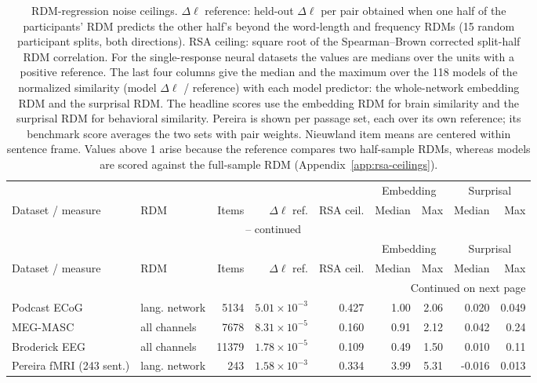 {\small\setlength{\tabcolsep}{3pt}
\begin{longtable}{@{}llrrrrrrr@{}}
\caption{RDM-regression noise ceilings. $\Delta\ell$ reference: held-out $\Delta\ell$ per pair obtained when one half of the
participants' RDM predicts the other half's beyond the word-length and frequency RDMs (15 random participant splits, both
directions). RSA ceiling: square root of the Spearman--Brown corrected split-half RDM correlation. For the single-response neural
datasets the values are medians over the units with a positive reference. The last four columns give the median and the
maximum over the 118 models of the normalized similarity (model $\Delta\ell$ / reference) with each model predictor: the
whole-network embedding RDM and the surprisal RDM. The headline scores use the embedding RDM for brain similarity and the
surprisal RDM for behavioral similarity. Pereira is shown per passage set, each over its own reference; its benchmark score
averages the two sets with pair weights. Nieuwland item means are centered within sentence frame. Values above 1 arise because
the reference compares two half-sample RDMs, whereas models are scored against the full-sample RDM
(Appendix~\ref{app:rsa-ceilings}).}\label{tab:rdm-ceilings} \\
\toprule
 & & & & & \multicolumn{2}{c}{Embedding} & \multicolumn{2}{c}{Surprisal} \\
\cmidrule(lr){6-7}\cmidrule(lr){8-9}
Dataset / measure & RDM & Items & $\Delta\ell$ ref. & RSA ceil. & Median & Max & Median & Max \\
\midrule
\endfirsthead
\multicolumn{9}{c}{\tablename\ \thetable{} -- continued} \\
\toprule
 & & & & & \multicolumn{2}{c}{Embedding} & \multicolumn{2}{c}{Surprisal} \\
\cmidrule(lr){6-7}\cmidrule(lr){8-9}
Dataset / measure & RDM & Items & $\Delta\ell$ ref. & RSA ceil. & Median & Max & Median & Max \\
\midrule
\endhead
\midrule\multicolumn{9}{r}{Continued on next page} \\
\endfoot
\bottomrule
\endlastfoot
Podcast ECoG & lang. network & 5134 & $5.01\times10^{-3}$ & 0.427 & 1.00 & 2.06 & 0.020 & 0.049 \\
MEG-MASC & all channels & 7678 & $8.31\times10^{-5}$ & 0.160 & 0.91 & 2.12 & 0.042 & 0.24 \\
Broderick EEG & all channels & 11379 & $1.78\times10^{-5}$ & 0.109 & 0.49 & 1.50 & 0.010 & 0.11 \\
Pereira fMRI (243 sent.) & lang. network & 243 & $1.58\times10^{-3}$ & 0.334 & 3.99 & 5.31 & -0.016 & 0.013 \\

\end{longtable}}
